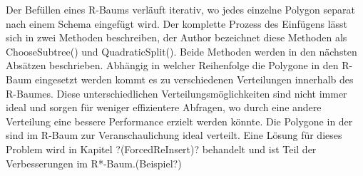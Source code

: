 \documentclass[runningheads,a4paper]{llncs}
\begin{document}
Der Befüllen eines R-Baums verläuft iterativ, wo jedes einzelne Polygon separat nach einem Schema eingefügt wird. Der komplette Prozess des Einfügens lässt sich in zwei Methoden beschreiben, der Author bezeichnet diese Methoden als ChooseSubtree() und QuadraticSplit(). Beide Methoden werden in den nächsten Absätzen beschrieben. Abhängig in welcher Reihenfolge die Polygone in den R-Baum eingesetzt werden kommt es zu verschiedenen Verteilungen innerhalb des R-Baumes. Diese unterschiedlichen Verteilungsmöglichkeiten sind nicht immer ideal und sorgen für weniger effizientere Abfragen, wo durch eine andere Verteilung eine bessere Performance erzielt werden könnte. Die Polygone in der  sind im R-Baum zur Veranschaulichung ideal verteilt. Eine Lösung für dieses Problem wird in Kapitel ?(ForcedReInsert)? behandelt und ist Teil der Verbesserungen im R*-Baum.(Beispiel?)
\end{document}
